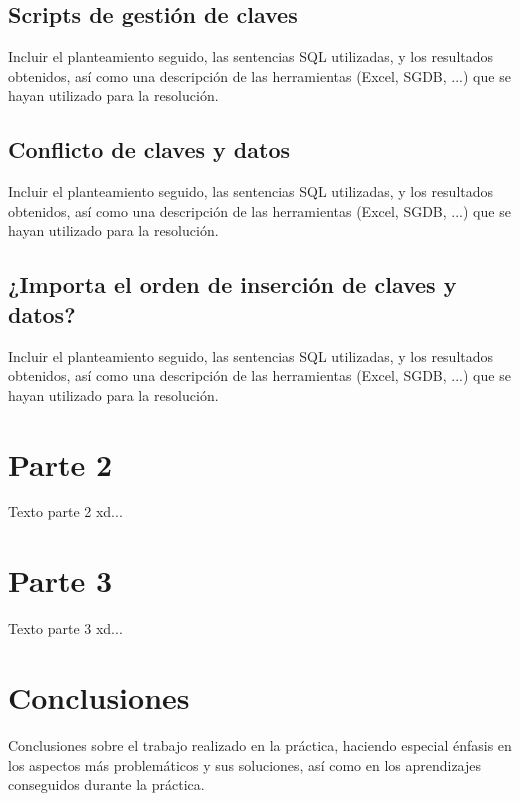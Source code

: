 \documentclass[a4paper, 11pt, oneside]{article} %
\begin{document}
\subsection{Scripts de gestión de claves}

Incluir el planteamiento seguido, las sentencias SQL utilizadas, y los resultados obtenidos, así como una descripción de las herramientas (Excel, SGDB, ...) que se hayan utilizado para la resolución.

\subsection{Conflicto de claves y datos}

Incluir el planteamiento seguido, las sentencias SQL utilizadas, y los resultados obtenidos, así como una descripción de las herramientas (Excel, SGDB, ...) que se hayan utilizado para la resolución.

\subsection{¿Importa el orden de inserción de claves y datos?}

Incluir el planteamiento seguido, las sentencias SQL utilizadas, y los resultados obtenidos, así como una descripción de las herramientas (Excel, SGDB, ...) que se hayan utilizado para la resolución.
	
\newpage


\section{Parte 2}

Texto parte 2 xd...
	
\newpage


\section{Parte 3}

Texto parte 3 xd...

\newpage


\section{Conclusiones}

Conclusiones sobre el trabajo realizado en la práctica, haciendo especial énfasis en los aspectos más problemáticos y sus soluciones, así como en los aprendizajes conseguidos durante la práctica.
\end{document}

